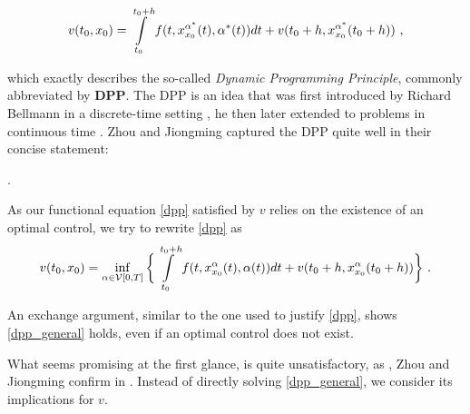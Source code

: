 	\begin{equation}
		\label{dpp}
		v(t_0, x_0) = \pathint{\alpha^{*}}{t_0}{t_0 + h} + v(t_0 + h, x^{\alpha^{*}}_{x_0}(t_0 + h)) \ ,
	\end{equation}
	
	which exactly describes the so-called \emph{Dynamic Programming Principle}, commonly abbreviated by \textbf{DPP}. The DPP is an idea that was first introduced by Richard Bellmann in a discrete-time setting \cite{bellmandiscrete}, he then later extended to problems in continuous time \cite{bellmancontinuous}. Zhou and Jiongming captured the DPP quite well in their concise statement: 
	
	\begin{center}
		 .
	\end{center}

	As our functional equation \ref{dpp} satisfied by $ v $ relies on the existence of an optimal control, we try to rewrite \ref{dpp} as
	\begin{equation}
	\label{dpp_general}
	v(t_0, x_0) = \inf\limits_{\alpha \in \controlspace} \bigg\{ \pathint{\alpha}{t_0}{t_0 + h} + v(t_0 + h, x^{\alpha}_{x_0}(t_0 + h)) \bigg\} \ .
	\end{equation}
	
	An exchange argument, similar to the one used to justify \ref{dpp}, shows \ref{dpp_general} holds, even if an optimal control does not exist.
	
	What seems promising at the first glance, is quite unsatisfactory, as , Zhou and Jiongming confirm in \cite[p. ~160]{zhou}.
	Instead of directly solving \ref{dpp_general}, we consider its implications for $ v $.